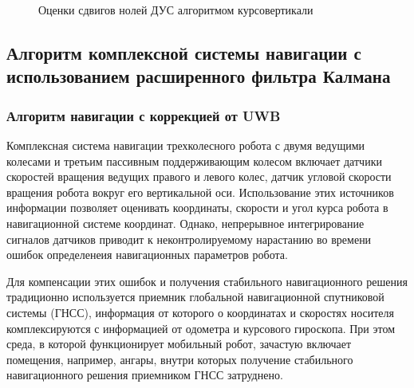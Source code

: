 \documentclass[14pt]{article}
\begin{document}
\begin{figure}
\noindent{}
\caption{Оценки сдвигов нолей ДУС алгоритмом курсовертикали}
\label{fig:ahrs_bias}
\end{figure}

\clearpage

\subsection{Алгоритм комплексной системы навигации с использованием расширенного фильтра Калмана}

\subsubsection{Алгоритм навигации с коррекцией от UWB}

Комплексная система навигации трехколесного робота с двумя ведущими колесами и третьим пассивным поддерживающим колесом включает датчики скоростей вращения ведущих правого и левого колес, датчик угловой скорости вращения робота вокруг его вертикальной оси. Использование этих источников информации позволяет оценивать координаты, скорости и угол курса робота в навигационной системе координат. Однако, непрерывное интегрирование  сигналов датчиков приводит к неконтролируемому нарастанию во времени ошибок определенеия навигационных параметров робота.

Для компенсации этих ошибок и получения стабильного навигационного решения традиционно используется приемник глобальной навигационной спутниковой системы (ГНСС), информация от которого о координатах и скоростях носителя комплексируются с информацией от одометра и курсового гироскопа. При этом среда, в которой функционирует мобильный робот, зачастую включает помещения, например, ангары, внутри которых получение стабильного навигационного решения приемником ГНСС затруднено.
\end{document}
